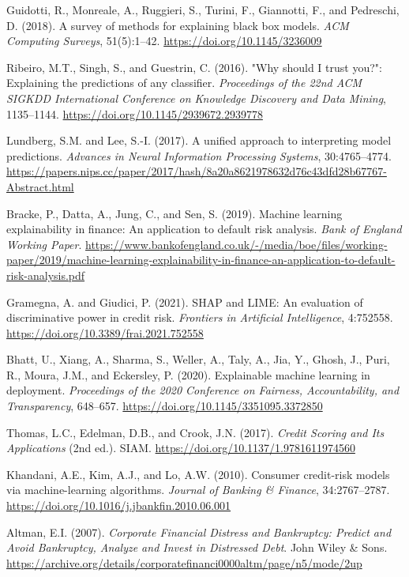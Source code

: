 \documentclass[a4paper,11pt,twoside]{article}
\newcommand{\0}{\Bf{0}}
\theoremstyle{definition}
\begin{document}
{\begin{thebibliography}{99}
{ Guidotti, R., Monreale, A., Ruggieri, S., Turini, F., Giannotti, F., and Pedreschi, D. (2018). A survey of methods for explaining black box models. \emph{ACM Computing Surveys}, 51(5):1--42. \url{https://doi.org/10.1145/3236009}

 Ribeiro, M.T., Singh, S., and Guestrin, C. (2016). "Why should I trust you?": Explaining the predictions of any classifier. \emph{Proceedings of the 22nd ACM SIGKDD International Conference on Knowledge Discovery and Data Mining}, 1135--1144. \url{https://doi.org/10.1145/2939672.2939778}

 Lundberg, S.M. and Lee, S.-I. (2017). A unified approach to interpreting model predictions. \emph{Advances in Neural Information Processing Systems}, 30:4765--4774. \url{https://papers.nips.cc/paper/2017/hash/8a20a8621978632d76c43dfd28b67767-Abstract.html}

 Bracke, P., Datta, A., Jung, C., and Sen, S. (2019). Machine learning explainability in finance: An application to default risk analysis. \emph{Bank of England Working Paper}. \url{https://www.bankofengland.co.uk/-/media/boe/files/working-paper/2019/machine-learning-explainability-in-finance-an-application-to-default-risk-analysis.pdf}

 Gramegna, A. and Giudici, P. (2021). SHAP and LIME: An evaluation of discriminative power in credit risk. \emph{Frontiers in Artificial Intelligence}, 4:752558. \url{https://doi.org/10.3389/frai.2021.752558}

 Bhatt, U., Xiang, A., Sharma, S., Weller, A., Taly, A., Jia, Y., Ghosh, J., Puri, R., Moura, J.M., and Eckersley, P. (2020). Explainable machine learning in deployment. \emph{Proceedings of the 2020 Conference on Fairness, Accountability, and Transparency}, 648--657. \url{https://doi.org/10.1145/3351095.3372850}

 Thomas, L.C., Edelman, D.B., and Crook, J.N. (2017). \emph{Credit Scoring and Its Applications} (2nd ed.). SIAM. \url{https://doi.org/10.1137/1.9781611974560}

 Khandani, A.E., Kim, A.J., and Lo, A.W. (2010). Consumer credit-risk models via machine-learning algorithms. \emph{Journal of Banking \& Finance}, 34:2767--2787. \url{https://doi.org/10.1016/j.jbankfin.2010.06.001}

 Altman, E.I. (2007). \emph{Corporate Financial Distress and Bankruptcy: Predict and Avoid Bankruptcy, Analyze and Invest in Distressed Debt}. John Wiley \& Sons. \url{https://archive.org/details/corporatefinanci0000altm/page/n5/mode/2up}

}
\end{thebibliography}}
\end{document}
